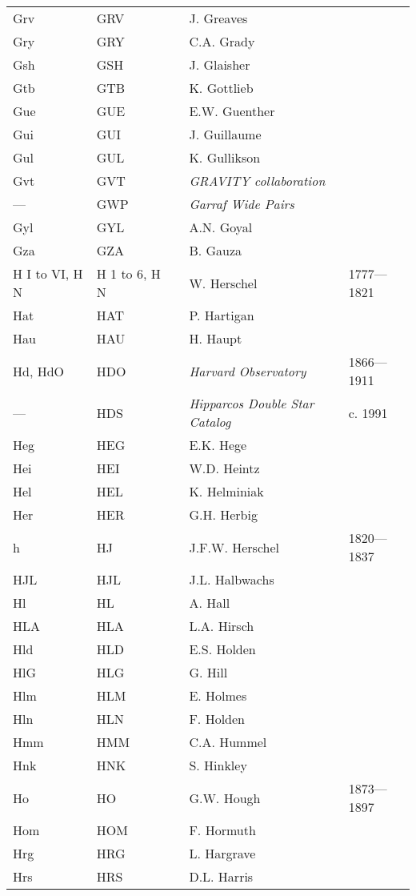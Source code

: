 \begin{longtable}{l|l|c|p{59mm}|l}
Grv & GRV &   & J. Greaves & \\
Gry & GRY &   & C.A. Grady & \\
Gsh & GSH &   & J. Glaisher & \\
Gtb & GTB &   & K. Gottlieb & \\
Gue & GUE &   & E.W. Guenther & \\
Gui & GUI &   & J. Guillaume & \\
Gul & GUL &   & K. Gullikson & \\
Gvt & GVT &   & \emph{GRAVITY collaboration} & \\
--- & GWP &   & \emph{Garraf Wide Pairs} & \\
Gyl & GYL &   & A.N. Goyal & \\
Gza & GZA &   & B. Gauza & \\\midrule
H I to VI, H N & H 1 to 6, H N &   & W. Herschel & 1777---1821 \\
Hat & HAT &   & P. Hartigan & \\
Hau & HAU &   & H. Haupt & \\
Hd, HdO & HDO &   & \emph{Harvard Observatory} & 1866---1911 \\
--- & HDS &   & \emph{Hipparcos Double Star Catalog} & c. 1991 \\
Heg & HEG &   & E.K. Hege & \\
Hei & HEI &   & W.D. Heintz & \\
Hel & HEL &   & K. Helminiak & \\
Her & HER &   & G.H. Herbig & \\
h    & HJ  &   & J.F.W. Herschel & 1820---1837 \\
HJL & HJL &   & J.L. Halbwachs & \\
Hl  & HL  &   & A. Hall & \\
HLA & HLA &   & L.A. Hirsch & \\
Hld & HLD &   & E.S. Holden & \\
HlG & HLG &   & G. Hill & \\
Hlm & HLM &   & E. Holmes & \\
Hln & HLN &   & F. Holden & \\
Hmm & HMM &   & C.A. Hummel & \\
Hnk & HNK &   & S. Hinkley & \\
Ho  & HO  &   & G.W. Hough & 1873---1897 \\
Hom & HOM &   & F. Hormuth & \\
Hrg & HRG &   & L. Hargrave & \\
Hrs & HRS &   & D.L. Harris & \\

\end{longtable}
